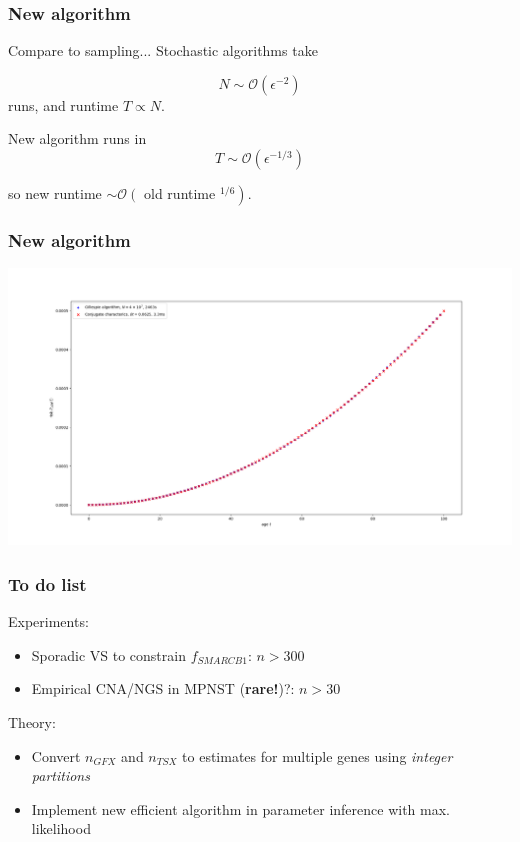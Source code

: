 \documentclass{beamer}
\begin{document}
\begin{frame}
    \frametitle{New algorithm}

    Compare to sampling... Stochastic algorithms take
    
    \begin{equation}
        N \sim \mathcal{O}(\epsilon^{-2})
    \end{equation}
    runs, and runtime $T \propto N$.

    \;

    New algorithm runs in
    \begin{equation}
       T \sim \mathcal{O}(\epsilon^{-1/3})
    \end{equation}

    so new runtime $\sim \mathcal{O}\left(\right.$ old runtime
    $\left.^{1/6}\right)$.
\end{frame}

\begin{frame}
    \frametitle{New algorithm}

    \includegraphics[width=\textwidth]{figures/Figure_1.png}
\end{frame}

\begin{frame}
    \frametitle{To do list}

    Experiments:
    \begin{itemize}
        \item Sporadic VS to constrain $f_{SMARCB1}$: $n > 300$
        \item Empirical CNA/NGS in MPNST (\textbf{rare!})?: $n > 30$
    \end{itemize}
    Theory:
    \begin{itemize}
        \item Convert $n_{GFX}$ and $n_{TSX}$ to estimates for multiple genes
        using \emph{integer partitions}
        \item Implement new efficient algorithm in parameter inference with max.
        likelihood 
    \end{itemize}
\end{frame}
\end{document}
